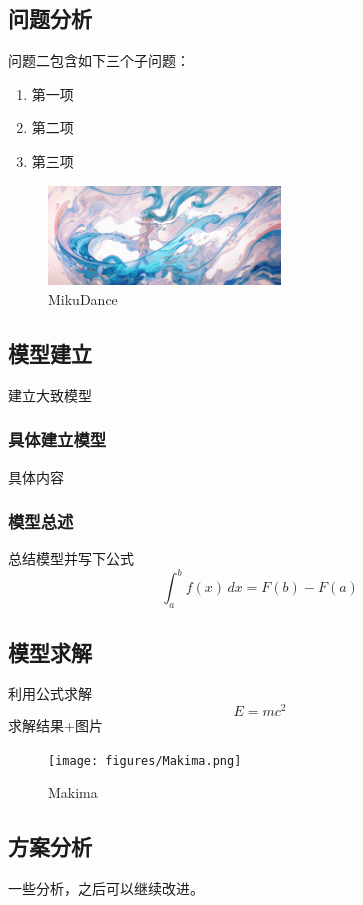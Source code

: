\documentclass[12pt,a4paper]{article}
\numberwithin{figure}{subsection}
\numberwithin{figure}{subsection}
\begin{document}
\subsection{问题分析}
问题二包含如下三个子问题：
\begin{enumerate}[itemsep=-0.2em,topsep=0em]
  \item 第一项
  \item 第二项
  \item 第三项
\end{enumerate}
\begin{figure}[H]%
  \centering
  \includegraphics[width = 0.55\textwidth]{figures/Miku_Dance.jpg}
  \caption{MikuDance}
  \label{img:MikuDance}    
\end{figure}

\subsection{模型建立}
建立大致模型
\subsubsection{具体建立模型}
具体内容
\subsubsection{模型总述}
总结模型并写下公式
\begin{equation}
  \int_a^b f(x) \, dx = F(b) - F(a)
\end{equation}
\subsection{模型求解}
利用公式求解
\begin{equation}
  E=mc^2
\end{equation}
求解结果+图片
\begin{figure}[H]%
  \centering
  \texttt{[image: figures/Makima.png]}
  \caption{Makima}
  \label{img:Makima}    
\end{figure}

\subsection{方案分析}
一些分析，之后可以继续改进。
\end{document}
